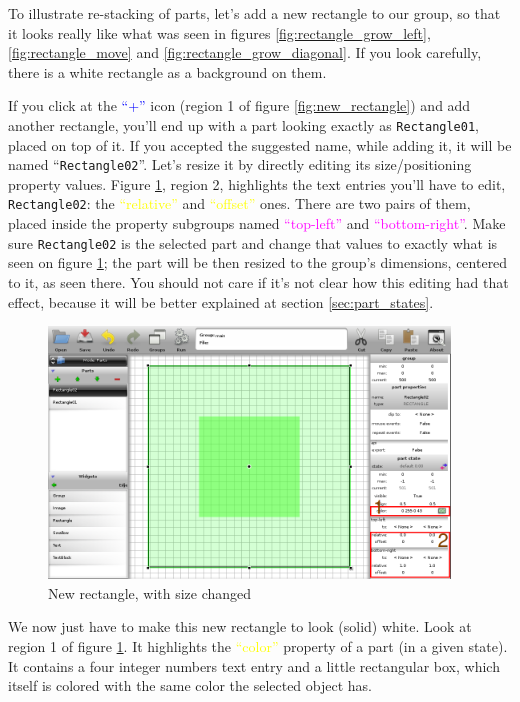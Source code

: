 \documentclass[a4paper]{profusion}
\newcommand{\GUIIcon}[1]{\textcolor{blue}{#1}}    %
\newcommand{\GUILabel}[1]{\textcolor{magenta}{#1}}
\newcommand{\GUIEditable}[1]{\textcolor{yellow}{#1}} %
\begin{document}
To illustrate re-stacking of parts, let's add a new rectangle to our
group, so that it looks really like what was seen in figures
\ref{fig:rectangle_grow_left}, \ref{fig:rectangle_move} and
\ref{fig:rectangle_grow_diagonal}. If you look carefully, there is a
white rectangle as a background on them.

If you click at the \GUIIcon{``+''} icon (region 1 of figure
\ref{fig:new_rectangle}) and add another rectangle, you'll end up with
a part looking exactly as \texttt{Rectangle01}, placed on top of
it. If you accepted the suggested name, while adding it, it will be
named ``\texttt{Rectangle02}''. Let's resize it by directly editing
its size/positioning property values. Figure
\ref{fig:restack_pre_pre}, region 2, highlights the text entries
you'll have to edit, \texttt{Rectangle02}: the
\GUIEditable{``relative''} and \GUIEditable{``offset''} ones. There
are two pairs of them, placed inside the property subgroups named
\GUILabel{``top-left''} and \GUILabel{``bottom-right''}. Make sure
\texttt{Rectangle02} is the selected part and change that values to
exactly what is seen on figure \ref{fig:restack_pre_pre}; the part
will be then resized to the group's dimensions, centered to it, as
seen there. You should not care if it's not clear how this editing had
that effect, because it will be better explained at section
\ref{sec:part_states}.

\begin{figure}[h!]
  \centering
  \includegraphics[width=0.95\textwidth]{images/part_resize_entries.png}
  \caption{New rectangle, with size changed}
  \label{fig:restack_pre_pre}
\end{figure}

We now just have to make this new rectangle to look (solid) white.
Look at region 1 of figure \ref{fig:restack_pre_pre}. It highlights
the \GUIEditable{``color''} property of a part (in a given state). It
contains a four integer numbers text entry and a little rectangular
box, which itself is colored with the same color the selected object
has.
\end{document}
